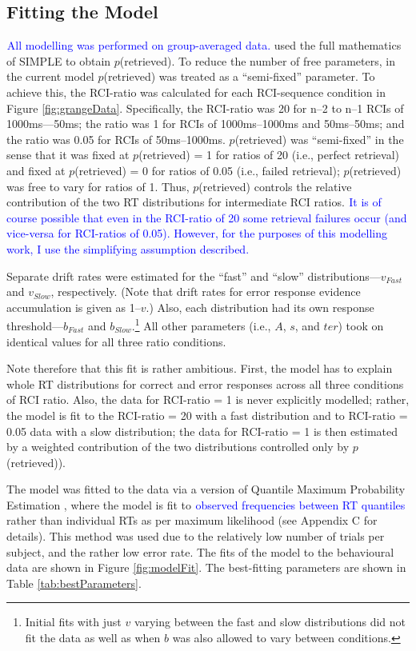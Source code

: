 \documentclass[a4paper, man, natbib]{apa6}
\newcommand{\jg}[1]{\textcolor{blue}{$^{\textrm{}}${#1}}}
\begin{document}
\subsection{Fitting the Model}

\jg{All modelling was performed on group-averaged data.} \cite{Grange2015} used the full mathematics of SIMPLE to obtain $p$(retrieved). To reduce the number of free parameters, in the current model $p$(retrieved) was treated as a ``semi-fixed'' parameter. To achieve this, the RCI-ratio was calculated for each RCI-sequence condition in Figure \ref{fig:grangeData}. Specifically, the RCI-ratio was 20 for n--2 to n--1 RCIs of 1000ms---50ms; the ratio was 1 for RCIs of 1000ms--1000ms and 50ms--50ms; and the ratio was 0.05 for RCIs of 50ms--1000ms. $p$(retrieved) was ``semi-fixed'' in the sense that it was fixed at $p$(retrieved) = 1 for ratios of 20 (i.e., perfect retrieval) and fixed at $p$(retrieved) = 0 for ratios of 0.05 (i.e., failed retrieval); $p$(retrieved) was free to vary for ratios of 1. Thus, $p$(retrieved) controls the relative contribution of the two RT distributions for intermediate RCI ratios. \jg{It is of course possible that even in the RCI-ratio of 20 some retrieval failures occur (and vice-versa for RCI-ratios of 0.05). However, for the purposes of this modelling work, I use the simplifying assumption described.}

Separate drift rates were estimated for the ``fast'' and ``slow'' distributions---$v_{Fast}$ and $v_{Slow}$, respectively. (Note that drift rates for error response evidence accumulation is given as 1--$v$.) Also, each distribution had its own response threshold---$b_{Fast}$ and $b_{Slow}$.\footnote{Initial fits with just $v$ varying between the fast and slow distributions did not fit the data as well as when $b$ was also allowed to vary between conditions.} All other parameters (i.e., $A$, $s$, and $ter$) took on identical values for all three ratio conditions. 

Note therefore that this fit is rather ambitious. First, the model has to explain whole RT distributions for correct and error responses across all three conditions of RCI ratio. Also, the data for RCI-ratio = 1 is never explicitly modelled; rather, the model is fit to the RCI-ratio = 20 with a fast distribution and to RCI-ratio = 0.05 data with a slow distribution; the data for RCI-ratio = 1 is then estimated by a weighted contribution of the two distributions controlled only by $p$(retrieved)). 

The model was fitted to the data via a version of Quantile Maximum Probability Estimation \citep[QMPE][]{Heathcote2002}, where the model is fit to \jg{observed frequencies between RT quantiles} rather than individual RTs as per maximum likelihood (see Appendix C for details). This method was used due to the relatively low number of trials per subject, and the rather low error rate. The fits of the model to the behavioural data are shown in Figure \ref{fig:modelFit}. The best-fitting parameters are shown in Table \ref{tab:bestParameters}. 
\end{document}
